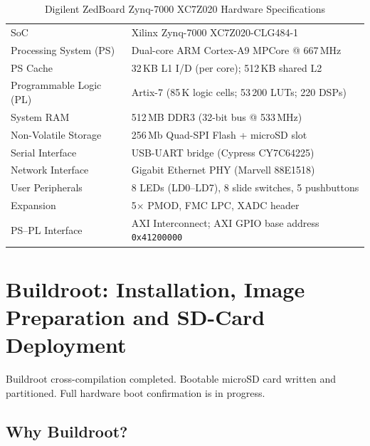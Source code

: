 \documentclass[12pt,a4paper]{article}
\begin{document}
\renewcommand{\arraystretch}{1.30}
\begin{table}[H]
\centering
\caption{Digilent ZedBoard Zynq-7000 XC7Z020 Hardware Specifications}
\label{tab:zedboard}
\small
\begin{tabularx}{\linewidth}{@{} L{4.5cm} X @{}}
\toprule
{} &  \\
\midrule
{}
SoC                    & Xilinx Zynq-7000 XC7Z020-CLG484-1 \\
Processing System (PS) & Dual-core ARM Cortex-A9 MPCore @ 667\,MHz \\
PS Cache               & 32\,KB L1 I/D (per core); 512\,KB shared L2 \\
Programmable Logic (PL)& Artix-7 (85\,K logic cells; 53\,200 LUTs; 220 DSPs) \\
System RAM             & 512\,MB DDR3 (32-bit bus @ 533\,MHz) \\
Non-Volatile Storage   & 256\,Mb Quad-SPI Flash + microSD slot \\
Serial Interface       & USB-UART bridge (Cypress CY7C64225) \\
Network Interface      & Gigabit Ethernet PHY (Marvell 88E1518) \\
User Peripherals       & 8 LEDs (LD0--LD7), 8 slide switches, 5 pushbuttons \\
Expansion              & 5$\times$ PMOD, FMC LPC, XADC header \\
PS--PL Interface       & AXI Interconnect; AXI GPIO base address \texttt{0x41200000} \\
\bottomrule
\end{tabularx}
\end{table}

\clearpage

\section{Buildroot: Installation, Image Preparation and SD-Card Deployment}

\begin{verifiedbox}
Buildroot cross-compilation completed. Bootable microSD card written and partitioned.
Full hardware boot confirmation is in progress.
\end{verifiedbox}

\subsection{Why Buildroot?}
\end{document}
